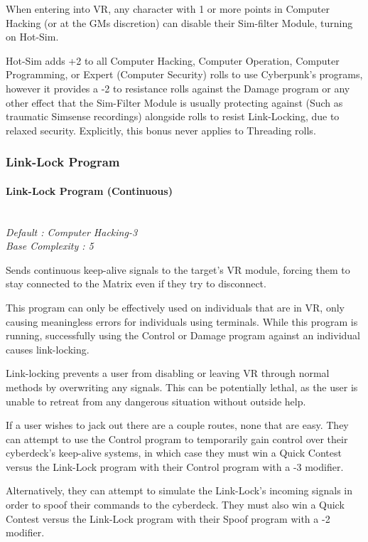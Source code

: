 \begin{multicols*}{3}
	When entering into VR, any character with 1 or more points in Computer Hacking (or at the GMs discretion) can disable their Sim-filter Module, turning on Hot-Sim. 
	
	Hot-Sim adds +2 to all Computer Hacking, Computer Operation, Computer Programming, or Expert (Computer Security) rolls to use Cyberpunk's programs, however it provides a -2 to resistance rolls against the Damage program or any other effect that the Sim-Filter Module is usually protecting against (Such as traumatic Simsense recordings) alongside rolls to resist Link-Locking, due to relaxed security. Explicitly, this bonus never applies to Threading rolls.
	
	\subsubsection{Link-Lock Program}
	
	\paragraph{Link-Lock Program (Continuous)}
	
	\textit{\textcolor{NavyBlue}{\\Default : Computer Hacking-3\\
			Base Complexity : 5}}
	
	Sends continuous keep-alive signals to the target’s VR module, forcing them to stay connected to the Matrix even if they try to disconnect. 
	
	This program can only be effectively used on individuals that are in VR, only causing meaningless errors for individuals using terminals. While this program is running, successfully using the Control or Damage program against an individual causes link-locking. 
	
	Link-locking prevents a user from disabling or leaving VR through normal methods by overwriting any signals. This can be potentially lethal, as the user is unable to retreat from any dangerous situation without outside help.
	
	If a user wishes to jack out there are a couple routes, none that are easy. They can attempt to use the Control program to temporarily gain control over their cyberdeck's keep-alive systems, in which case they must win a Quick Contest versus the Link-Lock program with their Control program with a -3 modifier.
	
	Alternatively, they can attempt to simulate the Link-Lock's incoming signals in order to spoof their commands to the cyberdeck. They must also win a Quick Contest versus the Link-Lock program with their Spoof program with a -2 modifier.
	

\end{multicols*}
